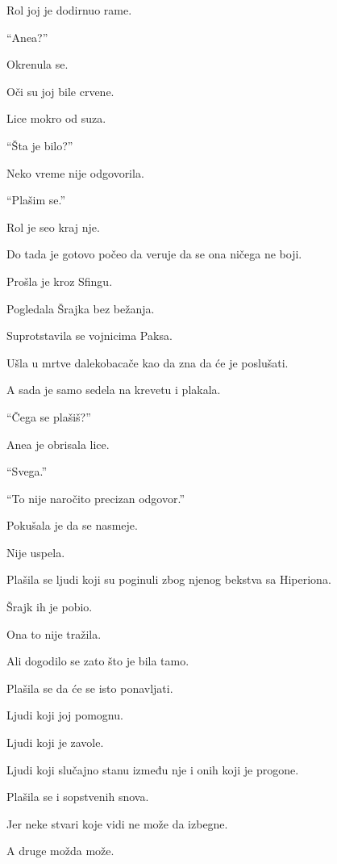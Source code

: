 Rol joj je dodirnuo rame.

``Anea?''

Okrenula se.

Oči su joj bile crvene.

Lice mokro od suza.

\bigskip

``Šta je bilo?''

Neko vreme nije odgovorila.

``Plašim se.''

\bigskip

Rol je seo kraj nje.

Do tada je gotovo počeo da veruje da se ona ničega ne boji.

Prošla je kroz Sfingu.

Pogledala Šrajka bez bežanja.

Suprotstavila se vojnicima Paksa.

Ušla u mrtve dalekobacače kao da zna da će je poslušati.

\bigskip

A sada je samo sedela na krevetu i plakala.

\bigskip

``Čega se plašiš?''

Anea je obrisala lice.

``Svega.''

``To nije naročito precizan odgovor.''

Pokušala je da se nasmeje.

Nije uspela.

\bigskip

Plašila se ljudi koji su poginuli zbog njenog bekstva sa Hiperiona.

Šrajk ih je pobio.

Ona to nije tražila.

Ali dogodilo se zato što je bila tamo.

\bigskip

Plašila se da će se isto ponavljati.

Ljudi koji joj pomognu.

Ljudi koji je zavole.

Ljudi koji slučajno stanu između nje i onih koji je progone.

\bigskip

Plašila se i sopstvenih snova.

Jer neke stvari koje vidi ne može da izbegne.

A druge možda može.

